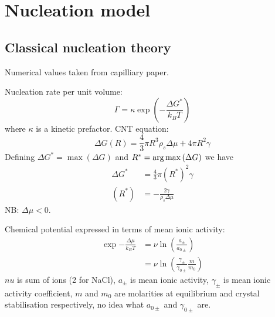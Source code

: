 \documentclass[12pt,twoside]{report}
\begin{document}

\section{Nucleation model}
\subsection{Classical nucleation theory}

Numerical values taken from capilliary paper.

Nucleation rate per unit volume:
\begin{equation}
  \Gamma = \kappa \exp{\left(-\frac{\Delta G^{*}}{k_B T}\right)}
\end{equation}
where $\kappa$ is a kinetic prefactor.
CNT equation:
\begin{equation}
  \Delta G(R) = \frac{4}{3} \pi R^3 \rho_s \Delta \mu + 4\pi R^2 \gamma
\end{equation}
Defining $\Delta G^{*} = \max{(\Delta G)}$ and $R^{*} = \operatorname*{arg\,max}{(\Delta G)}$ we have
\begin{align}
  \Delta G^{*} &= \frac{4}{3} \pi (R^{*})^2 \gamma \\
  (R^{*}) &= -\frac{2\gamma}{\rho_s \Delta\mu}
\end{align}
NB: $\Delta \mu < 0$.

Chemical potential expressed in terms of mean ionic activity:
\begin{equation}
  \begin{aligned}
  \exp{-\frac{\Delta \mu}{k_B T}} &=
  \nu \ln{\left( \frac{a_\pm}{a_{0\pm}} \right)} \\
  &=
  \nu \ln{\left( \frac{\gamma_\pm}{\gamma_{0\pm}} \frac{m}{m_0} \right)}
  \end{aligned}
\end{equation}
$nu$ is sum of ions (2 for NaCl), $a_\pm$ is mean ionic activity, $\gamma_\pm$ is mean ionic activity coefficient, $m$ and $m_0$ are molarities at equilibrium and crystal stabilisation respectively, no idea what $a_{0\pm}$ and $\gamma_{0\pm}$ are.
\end{document}
